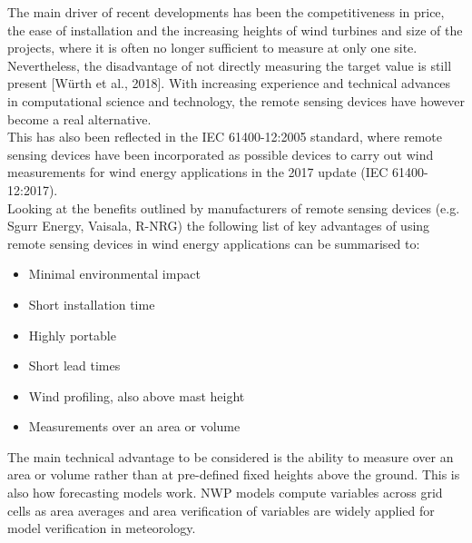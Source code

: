 The main driver of recent developments has been the competitiveness in price, the ease of installation and the increasing heights of wind turbines and size of the projects, where it is often no longer sufficient to measure at only one site. Nevertheless, the disadvantage of not directly measuring the target value is still present [W{\"u}rth et al., 2018]. With increasing experience and technical advances in computational science and technology, the remote sensing devices have however become a real alternative.\\

This has also been reflected in the IEC 61400-12:2005 standard, where remote sensing devices have been incorporated as possible devices to carry out wind measurements for wind energy applications in the 2017 update (IEC 61400-12:2017).\\

Looking at the benefits outlined by manufacturers of remote sensing devices (e.g. Sgurr Energy, Vaisala, R-NRG) the following list of key advantages of using remote sensing devices in wind energy applications can be summarised to:\\
\begin{itemize}
    \vspace{-0.2cm}\item Minimal environmental impact
    \vspace{-0.2cm}\item Short installation time
   \vspace{-0.2cm} \item Highly portable
    \vspace{-0.2cm}\item Short lead times
   \vspace{-0.2cm} \item Wind profiling, also above mast height
    \vspace{-0.2cm}\item Measurements over an area or volume
\end{itemize}

The main technical advantage to be considered is the ability to measure over an area or volume rather than at pre-defined fixed heights above the ground. This is also how forecasting models work. NWP models compute variables across grid cells as area averages and area verification of variables are widely applied for model verification in meteorology. 


